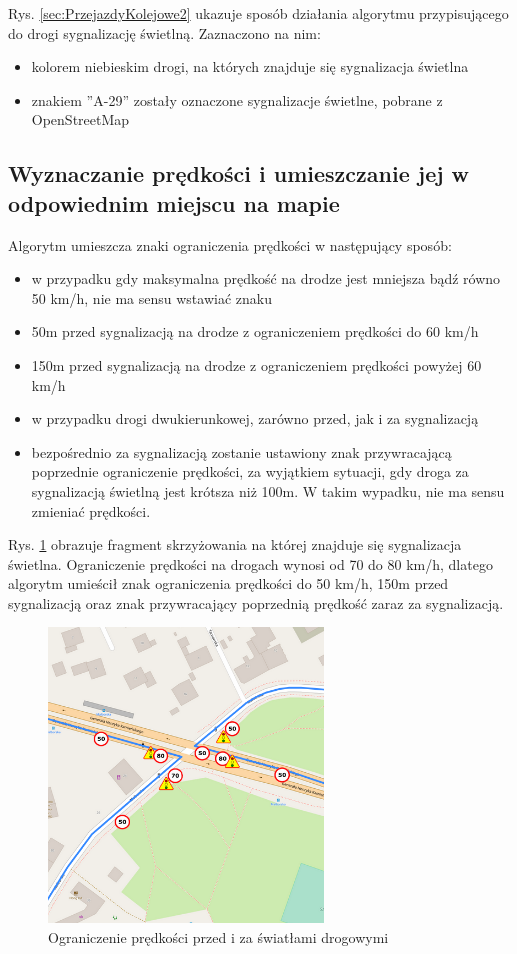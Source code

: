 Rys. \ref{sec:PrzejazdyKolejowe2} ukazuje sposób działania algorytmu przypisującego do drogi sygnalizację świetlną. Zaznaczono na nim:
\begin{itemize}
\item kolorem niebieskim drogi, na których znajduje się sygnalizacja świetlna
\item znakiem ''A-29'' zostały oznaczone sygnalizacje świetlne, pobrane z OpenStreetMap
\end{itemize}

\newpage
\subsection{Wyznaczanie prędkości i umieszczanie jej w odpowiednim miejscu na mapie}

Algorytm umieszcza znaki ograniczenia prędkości w następujący sposób:
\begin{itemize}
\item w przypadku gdy maksymalna prędkość na drodze jest mniejsza bądź równo 50 km/h, nie ma sensu wstawiać znaku
\item 50m przed sygnalizacją na drodze z ograniczeniem prędkości do 60 km/h
\item 150m przed sygnalizacją na drodze z ograniczeniem prędkości powyżej 60 km/h
\item w przypadku drogi dwukierunkowej, zarówno przed, jak i za sygnalizacją
\item bezpośrednio za sygnalizacją zostanie ustawiony znak przywracającą poprzednie ograniczenie prędkości, za wyjątkiem sytuacji, gdy droga za sygnalizacją świetlną jest krótsza niż 100m. W takim wypadku, nie ma sensu zmieniać prędkości.
\end{itemize}


Rys. \ref{sec:znakiSwiatla} obrazuje fragment skrzyżowania na której znajduje się sygnalizacja świetlna. Ograniczenie prędkości na drogach wynosi od 70 do 80 km/h, dlatego algorytm umieścił znak ograniczenia prędkości do 50 km/h, 150m przed sygnalizacją oraz znak przywracający poprzednią prędkość zaraz za sygnalizacją.

\begin{figure}[h]
\caption{Ograniczenie prędkości przed i za światłami drogowymi}
\label{sec:znakiSwiatla}
\centering
\includegraphics[width=0.65\textwidth]{speedBeforeSignals}
\end{figure}

